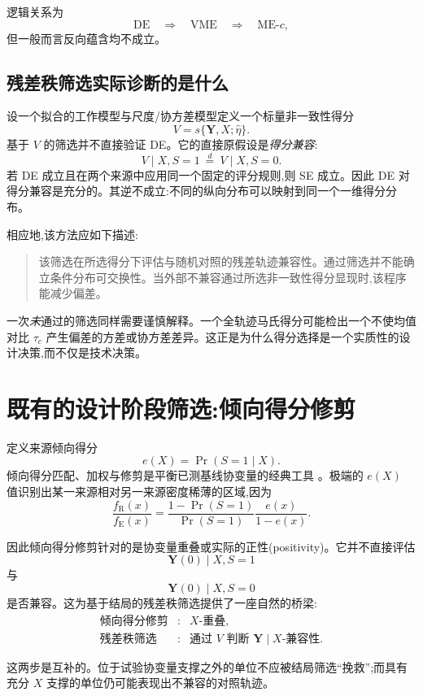 \documentclass[11pt]{article}
\newcommand{\R}{\mathrm{R}}
\newcommand{\E}{\mathrm{E}}
\begin{document}
逻辑关系为
\[
\text{DE}\quad\Longrightarrow\quad\text{VME}\quad\Longrightarrow\quad\text{ME-$c$},
\]
但一般而言反向蕴含均不成立。

\subsection{残差秩筛选实际诊断的是什么}

设一个拟合的工作模型与尺度/协方差模型定义一个标量非一致性得分
\[
V=s\{\bm Y,X;\widehat\eta\}.
\]
基于 $V$ 的筛选并不直接验证 DE。它的直接原假设是\emph{得分兼容}:
\[
V\mid X,S=1\ \overset{d}{=}\ V\mid X,S=0.
\tag{SE}
\]
若 DE 成立且在两个来源中应用同一个固定的评分规则,则 SE 成立。因此 DE 对得分兼容是充分的。其逆不成立:不同的纵向分布可以映射到同一个一维得分分布。

相应地,该方法应如下描述:

\begin{quote}
该筛选在所选得分下评估与随机对照的残差轨迹兼容性。通过筛选并不能确立条件分布可交换性。当外部不兼容通过所选非一致性得分显现时,该程序能减少偏差。
\end{quote}

一次\emph{未}通过的筛选同样需要谨慎解释。一个全轨迹马氏得分可能检出一个不使均值对比 $\tau_c$ 产生偏差的方差或协方差差异。这正是为什么得分选择是一个实质性的设计决策,而不仅是技术决策。

\section{既有的设计阶段筛选:倾向得分修剪}

定义来源倾向得分
\[
e(X)=\Pr(S=1\mid X).
\]
倾向得分匹配、加权与修剪是平衡已测基线协变量的经典工具 \citep{rosenbaum1983,crump2009}。极端的 $e(X)$ 值识别出某一来源相对另一来源密度稀薄的区域,因为
\[
\frac{f_{\R}(x)}{f_{\E}(x)}
=
\frac{1-\Pr(S=1)}{\Pr(S=1)}
\frac{e(x)}{1-e(x)}.
\]

因此倾向得分修剪针对的是协变量重叠或实际的正性(positivity)。它并不直接评估
\[
\bm Y(0)\mid X,S=1
\]
与
\[
\bm Y(0)\mid X,S=0
\]
是否兼容。这为基于结局的残差秩筛选提供了一座自然的桥梁:
\[
\begin{array}{ccl}
\text{倾向得分修剪} &:& X\text{-重叠},\\[0.2em]
\text{残差秩筛选} &:& \text{通过 }V\text{ 判断 }\bm Y\mid X\text{-兼容性}.
\end{array}
\]

这两步是互补的。位于试验协变量支撑之外的单位不应被结局筛选``挽救'';而具有充分 $X$ 支撑的单位仍可能表现出不兼容的对照轨迹。
\end{document}
